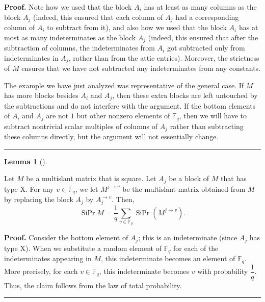 \documentclass[numbers=enddot,12pt,final,onecolumn,notitlepage]{scrartcl}%
\theoremstyle{definition}
\newtheorem{lem}[theo]{Lemma}
\newenvironment{lemma}[1][]
{\begin{lem}[#1]\begin{leftbar}}
{\end{leftbar}\end{lem}}
\newenvironment{proof}[1][Proof]{\noindent\textbf{#1.} }{\ \rule{0.5em}{0.5em}}
\let\sumnonlimits\sum
\renewcommand{\sum}{\sumnonlimits\limits}
\newcommand{\Fq}{\mathbb{F}_q}
\theoremstyle{plainsl}
\begin{document}
\begin{proof}
Note how we used that the block $A_{i}$ has at least as many columns as the
block $A_{j}$ (indeed, this ensured that each column of $A_{j}$ had a
corresponding column of $A_{i}$ to subtract from it), and also how we used
that the block $A_{i}$ has at most as many indeterminates as the block $A_{j}$
(indeed, this ensured that after the subtraction of columns, the
indeterminates from $A_{i}$ got subtracted only from indeterminates in $A_{j}%
$, rather than from the attic entries). Moreover, the strictness of $M$
ensures that we have not subtracted any indeterminates from any constants.

The example we have just analyzed was representative of the general case. If
$M$ has more blocks besides $A_{i}$ and $A_{j}$, then these extra blocks are
left untouched by the subtractions and do not interfere with the argument. If
the bottom elements of $A_{i}$ and $A_{j}$ are not $1$ but other nonzero
elements of $\Fq$, then we will have to subtract nontrivial scalar
multiples of columns of $A_{j}$ rather than subtracting these columns
directly, but the argument will not essentially change.
\end{proof}

\begin{lemma}
\label{lem.multislant.redX}Let $M$ be a multislant matrix that is square. Let
$A_{j}$ be a block of $M$ that has type X. For any $v\in\Fq$, we
let $M^{j\rightarrow v}$ be the multislant matrix obtained from $M$ by
replacing the block $A_{j}$ by $A_{j}^{\rightarrow v}$. Then,
\[
\operatorname*{SiPr}M=\dfrac{1}{q}\sum_{v\in\Fq}%
\operatorname*{SiPr}\left(  M^{j\rightarrow v}\right)  .
\]

\end{lemma}

\begin{proof}
Consider the bottom element of $A_{j}$; this is an indeterminate (since
$A_{j}$ has type X). When we substitute a random element of $\Fq$
for each of the indeterminates appearing in $M$, this indeterminate becomes an
element of $\Fq$. More precisely, for each $v\in\Fq$,
this indeterminate becomes $v$ with probability $\dfrac{1}{q}$. Thus, the
claim follows from the law of total probability.
\end{proof}
\end{document}
